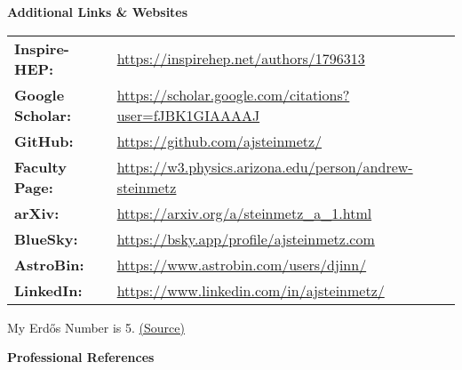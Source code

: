 \documentclass[11pt]{article}
\begin{document}
\newpage

{\Large\textbf{Additional Links \& Websites}}

\begin{tabular}{@{}ll@{}}
    \textbf{Inspire-HEP:} & \href{https://inspirehep.net/authors/1796313}{https://inspirehep.net/authors/1796313} \\
    \textbf{Google Scholar:} & \href{https://scholar.google.com/citations?user=fJBK1GIAAAAJ}{https://scholar.google.com/citations?user=fJBK1GIAAAAJ} \\
    \textbf{GitHub:} & \href{https://github.com/ajsteinmetz/}{https://github.com/ajsteinmetz/} \\
    \textbf{Faculty Page:} & \href{https://w3.physics.arizona.edu/person/andrew-steinmetz}{https://w3.physics.arizona.edu/person/andrew-steinmetz} \\
    \textbf{arXiv:} & \href{https://arxiv.org/a/steinmetz\_a\_1.html}{https://arxiv.org/a/steinmetz\_a\_1.html} \\
    \textbf{BlueSky:} & \href{https://bsky.app/profile/ajsteinmetz.com}{https://bsky.app/profile/ajsteinmetz.com} \\
    \textbf{AstroBin:} & \href{https://www.astrobin.com/users/djinn/}{https://www.astrobin.com/users/djinn/} \\
    \textbf{LinkedIn:} & \href{https://www.linkedin.com/in/ajsteinmetz/}{https://www.linkedin.com/in/ajsteinmetz/} \\
\end{tabular}

My Erd\H{o}s Number is 5. \href{https://mathscinet.ams.org/mathscinet/freetools/collab-dist?source=1443426\&target=189017}{(Source)}

\medskip

{\Large\textbf{Professional References}}
\end{document}
